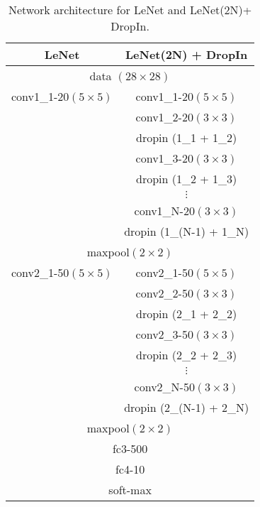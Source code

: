 \documentclass[10pt,twocolumn,letterpaper]{article}
\newcommand{\dropin}{DropIn }
\newcommand{\dropinNS}{DropIn}
\begin{document}
\begin{table}[htb]
\begin{center}
  \begin{tabular}{| c | c |}
    \hline
      LeNet & LeNet(2N) {\color{red}+ \dropin} \\ \hline
    
     \multicolumn{2}{|c|}{data $(28\times 28 )$} \\ \hline
     conv1\_1-20$(5\times 5)$ & conv1\_1-20$(5\times 5)$ \\ 
        & conv1\_2-20$(3\times 3)$ \\ 
       & {\color{red}dropin (1\_1 + 1\_2)} \\
        & conv1\_3-20$(3\times 3)$ \\ 
       & {\color{red}dropin (1\_2 + 1\_3)} \\ 
         & $\vdots$ \\ 
        & conv1\_N-20$(3\times 3)$ \\ 
       & {\color{red}dropin (1\_(N-1) + 1\_N)} \\ \hline
	\multicolumn{2}{|c|}{maxpool$(2\times2)$} \\ \hline

     conv2\_1-50$(5\times 5)$ & conv2\_1-50$(5\times 5)$ \\ 
       & conv2\_2-50$(3\times 3)$ \\ 
      & {\color{red}dropin (2\_1 + 2\_2)} \\
      & conv2\_3-50$(3\times 3)$ \\ 
      & {\color{red}dropin (2\_2 + 2\_3)} \\ 
       & $\vdots$ \\ 
      & conv2\_N-50$(3\times 3)$ \\ 
      & {\color{red}dropin (2\_(N-1) + 2\_N)} \\ \hline
\multicolumn{2}{|c|}{maxpool$(2\times2)$} \\ \hline
\multicolumn{2}{|c|}{fc3-500} \\ \hline
\multicolumn{2}{|c|}{fc4-10} \\ \hline
\multicolumn{2}{|c|}{soft-max} \\ \hline
  \end{tabular}
  \caption{Network architecture for LeNet and LeNet(2N)+ \dropinNS.  }
  \label{tab:lenet_N}
\end{center}
  \vspace{-20pt}
\end{table}
\end{document}
